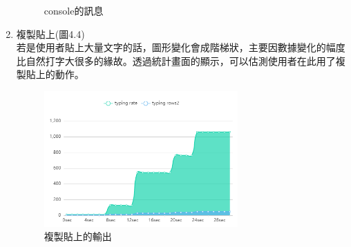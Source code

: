 \begin{enumerate}[1.]
\begin{figure}[H]
		\caption{console的訊息} 
		\label{Fig.4.3} 
	\end{figure}
	\item 複製貼上(圖4.4)\\
	若是使用者貼上大量文字的話，圖形變化會成階梯狀，主要因數據變化的幅度比自然打字大很多的緣故。透過統計畫面的顯示，可以估測使用者在此用了複製貼上的動作。
	\begin{figure}[H] 
		\centering 
		\includegraphics[width=0.7\textwidth]{4_4.png} 
		\caption{複製貼上的輸出} 
		\label{Fig.4.4} 
	\end{figure}
\end{enumerate}

